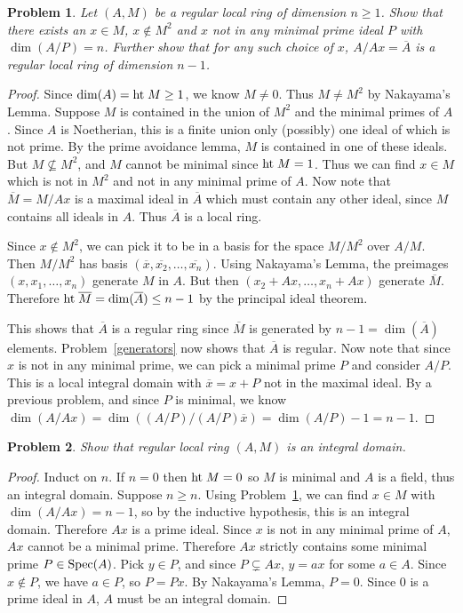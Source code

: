 \documentclass{article}
\newcommand{\spec}{\textup{Spec}}
\newcommand{\Ht}{\textup{ht}\;}
\newtheorem{problem}{Problem}
\begin{document}
\begin{problem}
\label{findx}
Let $(A,M)$ be a regular local ring of dimension $n \geq 1$. Show that there exists an $x \in M$, $x \notin M^2$ and $x$ not in any minimal prime ideal $P$ with $\dim(A/P) = n$. Further show that for any such choice of $x$, $A/Ax = \overline{A}$ is a regular local ring of dimension $n-1$.
\end{problem}
\begin{proof}
Since $\dim(A) = \Ht M \geq 1$, we know $M \neq 0$. Thus $M \neq M^2$ by Nakayama's Lemma. Suppose $M$ is contained in the union of $M^2$ and the minimal primes of $A$. Since $A$ is Noetherian, this is a finite union only (possibly) one ideal of which is not prime. By the prime avoidance lemma, $M$ is contained in one of these ideals. But $M \nsubseteq M^2$, and $M$ cannot be minimal since $\Ht M = 1$. Thus we can find $x \in M$ which is not in $M^2$ and not in any minimal prime of $A$. Now note that $\overline{M} = M/Ax$ is a maximal ideal in $\overline{A}$ which must contain any other ideal, since $M$ contains all ideals in $A$. Thus $\overline{A}$ is a local ring.

Since $x \notin M^2$, we can pick it to be in a basis for the space $M/M^2$ over $A/M$. Then $M/M^2$ has basis $(\overline{x}, \overline{x_2}, \dots , \overline{x_n})$. Using Nakayama's Lemma, the preimages $(x, x_1, \dots , x_n)$ generate $M$ in $A$. But then $(x_2 + Ax, \dots , x_n + Ax)$ generate $\overline{M}$. Therefore $\Ht \overline{M} = \dim(\overline{A}) \leq n-1$ by the principal ideal theorem. 

This shows that $\overline{A}$ is a regular ring since $\overline{M}$ is generated by $n-1 = \dim(\overline{A})$ elements. Problem~\ref{generators} now shows that $\overline{A}$ is regular. Now note that since $x$ is not in any minimal prime, we can pick a minimal prime $P$ and consider $A/P$. This is a local integral domain with $\overline{x} = x + P$ not in the maximal ideal. By a previous problem, and since $P$ is minimal, we know $\dim(A/Ax) = \dim((A/P)/(A/P)\overline{x}) = \dim(A/P) - 1 = n - 1$.
\end{proof}

\begin{problem}
Show that regular local ring $(A,M)$ is an integral domain.
\end{problem}
\begin{proof}
Induct on $n$. If $n = 0$ then $\Ht M = 0$ so $M$ is minimal and $A$ is a field, thus an integral domain. Suppose $n \geq n$. Using Problem~\ref{findx}, we can find $x \in M$ with $\dim(A/Ax) = n-1$, so by the inductive hypothesis, this is an integral domain. Therefore $Ax$ is a prime ideal. Since $x$ is not in any minimal prime of $A$, $Ax$ cannot be a minimal prime. Therefore $Ax$ strictly contains some minimal prime $P \in \spec(A)$. Pick $y \in P$, and since $P \subsetneq Ax$, $y = ax$ for some $a \in A$. Since $x \notin P$, we have $a \in P$, so $P = Px$. By Nakayama's Lemma, $P = 0$. Since $0$ is a prime ideal in $A$, $A$ must be an integral domain.
\end{proof}
\end{document}
